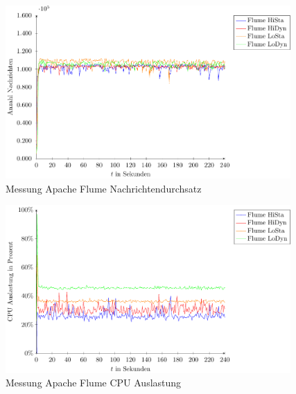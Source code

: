 \begin{figure}
\includegraphics[width=0.97\textwidth]{plots/messungFlumeDurchsatz.pdf}
\caption{Messung Apache Flume Nachrichtendurchsatz
\label{fig:messungFlumeNd}}
\end{figure}
\begin{figure}
\includegraphics[width=0.97\textwidth]{plots/messungFlumeCpu.pdf}
\caption{Messung Apache Flume CPU Auslastung
\label{fig:messungFlumeCpu}}
\end{figure}


